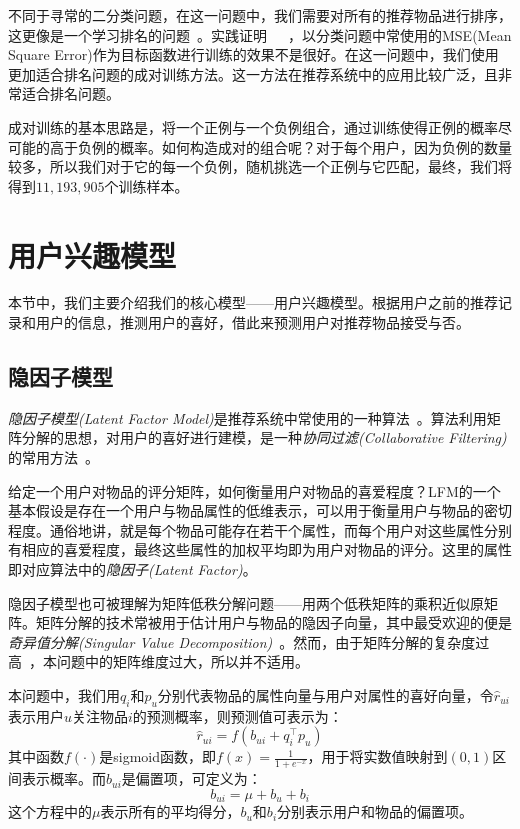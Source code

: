 \documentclass[12pt]{article} %
\newcommand\qq{\boldsymbol{\mathit{q}}}
\newcommand\pp{\boldsymbol{\mathit{p}}}
\begin{document}
\begin{sloppypar}
不同于寻常的二分类问题，在这一问题中，我们需要对所有的推荐物品进行排序，这更像是一个学习排名的问题~\cite{liu2009learning}。实践证明~\cite{furnkranz2003pairwise}~\cite{rendle2014improving}~\cite{sharma2013pairwise}，以分类问题中常使用的MSE(Mean Square Error)作为目标函数进行训练的效果不是很好。在这一问题中，我们使用更加适合排名问题的成对训练方法。这一方法在推荐系统中的应用比较广泛，且非常适合排名问题。

成对训练的基本思路是，将一个正例与一个负例组合，通过训练使得正例的概率尽可能的高于负例的概率。如何构造成对的组合呢？对于每个用户，因为负例的数量较多，所以我们对于它的每一个负例，随机挑选一个正例与它匹配，最终，我们将得到$11,193,905$个训练样本。


\newpage
\section{用户兴趣模型}

本节中，我们主要介绍我们的核心模型——用户兴趣模型。根据用户之前的推荐记录和用户的信息，推测用户的喜好，借此来预测用户对推荐物品接受与否。

\subsection{隐因子模型}

{\em 隐因子模型(Latent Factor Model)}是推荐系统中常使用的一种算法~\cite{koren2009matrix}。算法利用矩阵分解的思想，对用户的喜好进行建模，是一种{\em 协同过滤(Collaborative Filtering)}的常用方法~\cite{shen2012learning}。

给定一个用户对物品的评分矩阵，如何衡量用户对物品的喜爱程度？LFM的一个基本假设是存在一个用户与物品属性的低维表示，可以用于衡量用户与物品的密切程度。通俗地讲，就是每个物品可能存在若干个属性，而每个用户对这些属性分别有相应的喜爱程度，最终这些属性的加权平均即为用户对物品的评分。这里的属性即对应算法中的{\em 隐因子(Latent Factor)}。

隐因子模型也可被理解为矩阵低秩分解问题——用两个低秩矩阵的乘积近似原矩阵。矩阵分解的技术常被用于估计用户与物品的隐因子向量，其中最受欢迎的便是{\em 奇异值分解(Singular Value Decomposition)}~\cite{kleibergen2006generalized}。然而，由于矩阵分解的复杂度过高~\cite{klema1980singular}，本问题中的矩阵维度过大，所以并不适用。

本问题中，我们用$\qq_i$和$\pp_u$分别代表物品的属性向量与用户对属性的喜好向量，令$\hat{r}_{ui}$表示用户$u$关注物品$i$的预测概率，则预测值可表示为：
\begin{equation}
	\hat{r}_{ui} = f(b_{ui} + \qq_i^\top \pp_u)
\end{equation}
其中函数$f(\cdot)$是sigmoid函数，即$f(x) = \frac{1}{1 + e^{-x}}$，用于将实数值映射到$(0,1)$区间表示概率。而$b_{ui}$是偏置项，可定义为：
\begin{equation}
	b_{ui} = \mu + b_u + b_i
\end{equation}
这个方程中的$\mu$表示所有的平均得分，$b_u$和$b_i$分别表示用户和物品的偏置项。


\end{sloppypar}
\end{document}
